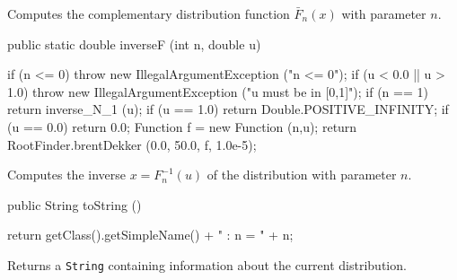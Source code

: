 \begin{tabb}
  Computes the complementary  distribution function  $\bar F_n(x)$
  with parameter $n$.
\end{tabb}
\begin{code}

   public static double inverseF (int n, double u)\begin{hide} {
      if (n <= 0)
         throw new IllegalArgumentException ("n <= 0");
      if (u < 0.0 || u > 1.0)
         throw new IllegalArgumentException ("u must be in [0,1]");
      if (n == 1)
         return inverse_N_1 (u);
      if (u == 1.0)
         return Double.POSITIVE_INFINITY;
      if (u == 0.0)
         return 0.0;
      Function f = new Function (n,u);
      return RootFinder.brentDekker (0.0, 50.0, f, 1.0e-5);
   }\end{hide}
\end{code}
\begin{tabb}
  Computes the inverse $x = F_n^{-1}(u)$ of the
  \ad{} distribution with parameter $n$.
\end{tabb}
\begin{hide}\begin{code}

   public String toString ()\begin{hide} {
      return getClass().getSimpleName() + " : n = " + n;
   }\end{hide}
\end{code}
\begin{tabb}
   Returns a \texttt{String} containing information about the current distribution.
\end{tabb}\end{hide}
\begin{code}\begin{hide}
}\end{hide}
\end{code}
